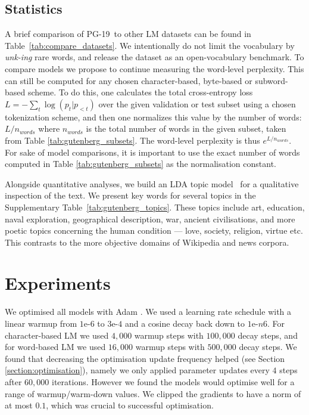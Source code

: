 \subsection{Statistics}
\label{sec:stats}
A brief comparison of PG-19~to other LM datasets can be found in Table~\ref{tab:compare_datasets}. 
We intentionally do not limit the vocabulary by \textit{unk-ing} rare words, and release the dataset as an open-vocabulary benchmark. To compare models we propose to continue measuring the word-level perplexity. This can still be computed for any chosen character-based, byte-based or subword-based scheme. To do this, one calculates the total cross-entropy loss $L = -\sum_t \log(p_t | p_{<t})$ over the given validation or test subset using a chosen tokenization scheme, and then one normalizes this value by the number of words: $L / n_{words}$ where $n_{words}$ is the total number of words in the given subset, taken from Table \ref{tab:gutenberg_subsets}. The word-level perplexity is thus $e^{L / n_{words}}$. For sake of model comparisons, it is important to use the exact number of words computed in Table \ref{tab:gutenberg_subsets} as the normalisation constant. 

Alongside quantitative analyses, we build an LDA topic model~\citep{blei2003latent} for a qualitative inspection of the text. We present key words for several topics in the Supplementary Table~\ref{tab:gutenberg_topics}. These topics include art, education, naval exploration, geographical description, war, ancient civilisations, and more poetic topics concerning the human condition --- love, society, religion, virtue etc. This contrasts to the more objective domains of Wikipedia and news corpora. 

\section{Experiments}

We optimised all models with Adam \citep{kingma2014adam}. We used a learning rate schedule with a linear warmup from $1\text{e-}6$ to $3\text{e-}4$ and a cosine decay back down to $1\text{e-}n6$. For character-based LM we used $4,000$ warmup steps with $100,000$ decay steps, and for word-based LM we used $16,000$ warmup steps with $500,000$ decay steps. We found that decreasing the optimisation update frequency helped (see Section \ref{section:optimisation}), namely we only applied parameter updates every $4$ steps after $60,000$ iterations. However we found the models would optimise well for a range of warmup/warm-down values. We clipped the gradients to have a norm of at most $0.1$, which was crucial to successful optimisation. 

